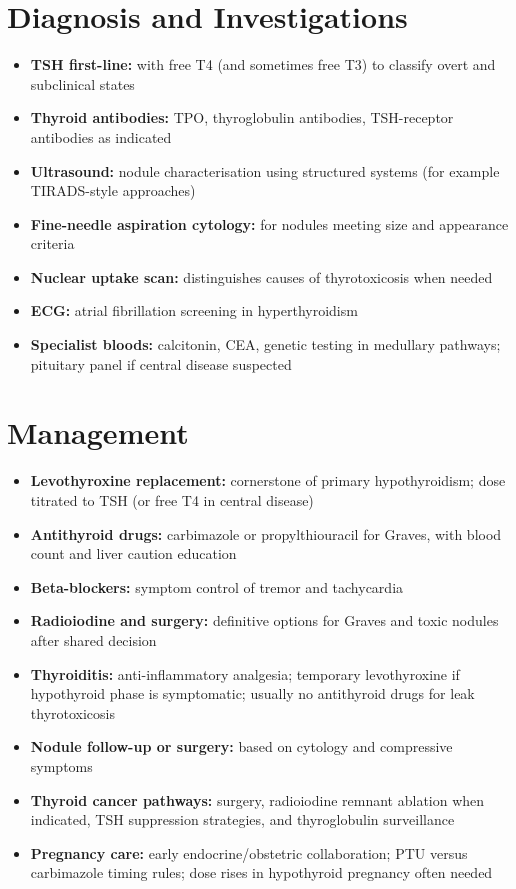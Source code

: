 \section*{Diagnosis and Investigations}
\begin{itemize}
    \item \textbf{TSH first-line:} with free T4 (and sometimes free T3) to classify overt and subclinical states
    \item \textbf{Thyroid antibodies:} TPO, thyroglobulin antibodies, TSH-receptor antibodies as indicated
    \item \textbf{Ultrasound:} nodule characterisation using structured systems (for example TIRADS-style approaches)
    \item \textbf{Fine-needle aspiration cytology:} for nodules meeting size and appearance criteria
    \item \textbf{Nuclear uptake scan:} distinguishes causes of thyrotoxicosis when needed
    \item \textbf{ECG:} atrial fibrillation screening in hyperthyroidism
    \item \textbf{Specialist bloods:} calcitonin, CEA, genetic testing in medullary pathways; pituitary panel if central disease suspected
\end{itemize}

\section*{Management}
\begin{itemize}
    \item \textbf{Levothyroxine replacement:} cornerstone of primary hypothyroidism; dose titrated to TSH (or free T4 in central disease)
    \item \textbf{Antithyroid drugs:} carbimazole or propylthiouracil for Graves, with blood count and liver caution education
    \item \textbf{Beta-blockers:} symptom control of tremor and tachycardia
    \item \textbf{Radioiodine and surgery:} definitive options for Graves and toxic nodules after shared decision
    \item \textbf{Thyroiditis:} anti-inflammatory analgesia; temporary levothyroxine if hypothyroid phase is symptomatic; usually no antithyroid drugs for leak thyrotoxicosis
    \item \textbf{Nodule follow-up or surgery:} based on cytology and compressive symptoms
    \item \textbf{Thyroid cancer pathways:} surgery, radioiodine remnant ablation when indicated, TSH suppression strategies, and thyroglobulin surveillance
    \item \textbf{Pregnancy care:} early endocrine/obstetric collaboration; PTU versus carbimazole timing rules; dose rises in hypothyroid pregnancy often needed
\end{itemize}

